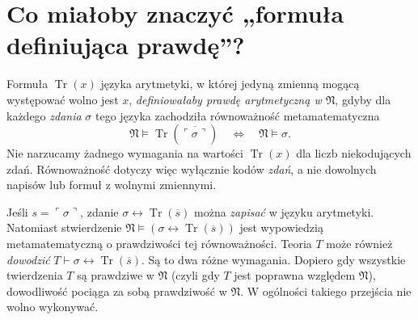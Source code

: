\section{Co miałoby znaczyć „formuła definiująca prawdę”?}
\begin{definicja}
Formuła $\operatorname{Tr}(x)$ języka arytmetyki,
w której jedyną zmienną mogącą występować wolno jest $x$,
\emph{definiowałaby prawdę arytmetyczną w $\mathfrak N$},
gdyby dla każdego \emph{zdania} $\sigma$ tego języka
zachodziła równoważność metamatematyczna
\[
\mathfrak N\models\operatorname{Tr}(\overline{\ulcorner\sigma\urcorner})
\quad\Longleftrightarrow\quad
\mathfrak N\models\sigma.
\]
Nie narzucamy żadnego wymagania na wartości
$\operatorname{Tr}(x)$ dla liczb niekodujących zdań.
Równoważność dotyczy więc wyłącznie kodów \emph{zdań},
a nie dowolnych napisów lub formuł z wolnymi zmiennymi.
\end{definicja}

\begin{uwaga}
Jeśli $s=\ulcorner\sigma\urcorner$, zdanie
$\sigma\leftrightarrow\operatorname{Tr}(\overline s)$
można \emph{zapisać} w języku arytmetyki.
Natomiast stwierdzenie
$\mathfrak N\models(\sigma\leftrightarrow\operatorname{Tr}(\overline s))$
jest wypowiedzią metamatematyczną o prawdziwości tej równoważności.
Teoria $T$ może również \emph{dowodzić}
$T\vdash\sigma\leftrightarrow\operatorname{Tr}(\overline s)$.
Są to dwa różne wymagania. Dopiero gdy wszystkie twierdzenia $T$
są prawdziwe w $\mathfrak N$ (czyli gdy $T$ jest poprawna
względem $\mathfrak N$), dowodliwość pociąga za sobą
prawdziwość w $\mathfrak N$. W ogólności takiego przejścia
nie wolno wykonywać.
\end{uwaga}

